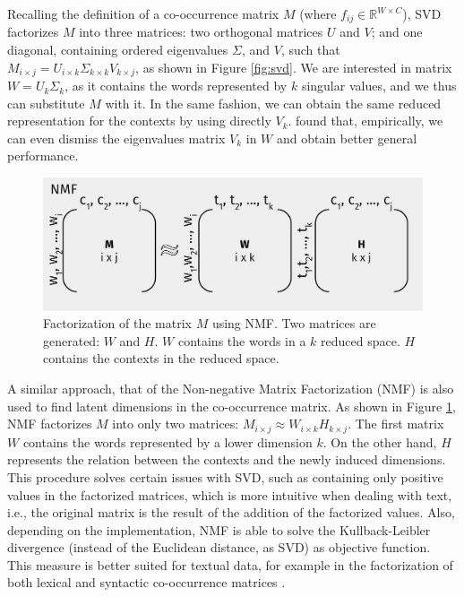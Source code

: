 Recalling  the  definition of a co-occurrence matrix $M$ (where $f_{ij} \in \mathbb{R}^{W\times C}$), SVD factorizes $M$ into three matrices: two orthogonal matrices $U$ and $V$; and one diagonal, containing ordered eigenvalues $\Sigma$, and $V$, such that $M_{i\times j} = U_{i\times k}\Sigma_{k\times k}V_{k\times j}$, as shown in Figure \ref{fig:svd}. We are interested in matrix $W= U_k\Sigma_k$, as it  contains the words represented by $k$ singular values, and we thus can substitute $M$ with it. In the same fashion, we can obtain the same reduced representation for the contexts by using directly $V_k$. \cite{levy2015improving} found that, empirically, we can even dismiss the eigenvalues matrix $V_k$ in $W$ and obtain better general performance.


\begin{figure}
\centering
\includegraphics[width=.8\linewidth]{images/Chapitre2/nmf.pdf}
\caption{Factorization of the matrix $M$ using NMF. Two matrices are generated: $W$ and $H$. $W$ contains the words in a $k$ reduced space. $H$ contains the contexts in the reduced space.}
\label{fig:nmf}
\end{figure}

A similar approach, that of the Non-negative Matrix Factorization \cite{lee2001algorithms} (NMF)  is  also used to find latent  dimensions in the co-occurrence matrix. As shown in Figure \ref{fig:nmf}, NMF factorizes $M$ into only two matrices: $M_{i \times j} \approx W_{i\times k} H_{k\times j}$. The first matrix $W$ contains the words represented by a lower dimension $k$. On the other hand, $H$ represents the relation between the contexts and the newly induced dimensions. This procedure solves certain issues with SVD, such as containing only positive values in the factorized matrices, which is more intuitive when dealing with text, i.e., the original matrix is the result of the addition of the factorized values. Also, depending on the implementation, NMF is able to solve the Kullback-Leibler divergence (instead of the Euclidean distance, as SVD) as objective function. This measure is better suited for textual data, for example in the factorization of both lexical and syntactic co-occurrence matrices \cite{VandeCruys2011}.
 

